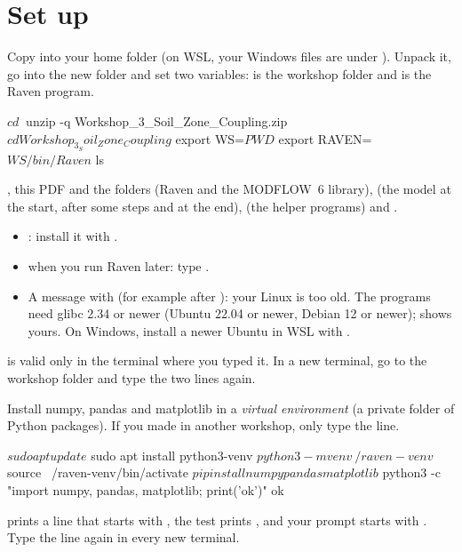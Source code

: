 \section{Set up}

\label{st:unpack}
Copy  into your home folder (on WSL, your Windows files are under
). Unpack it, go into the new folder and set two variables:  is the workshop folder and 
is the Raven program.
\begin{shell}
$ cd ~
$ unzip -q Workshop_3_Soil_Zone_Coupling.zip
$ cd Workshop_3_Soil_Zone_Coupling
$ export WS=$PWD
$ export RAVEN=$WS/bin/Raven
$ ls
\end{shell}
\see {}, this PDF and the folders  (Raven and the MODFLOW~6 library),  (the model at the
start, after some steps and at the end),  (the helper programs) and .
\begin{trouble}
\begin{itemize}
\item {}: install it with .
\item {} when you run Raven later: type .
\item A message with  (for example after ): your Linux is too old. The programs need glibc 2.34 or newer (Ubuntu 22.04 or newer, Debian 12 or newer);  shows yours. On Windows, install a newer Ubuntu in WSL with .
\end{itemize}
\end{trouble}
\begin{note}
 is valid only in the terminal where you typed it. In a new terminal, go to the workshop folder and type the
two  lines again.
\end{note}

\label{st:python}
Install numpy, pandas and matplotlib in a \emph{virtual environment} (a private folder of Python packages). If you made
 in another workshop, only type the  line.
\begin{shell}
$ sudo apt update
$ sudo apt install python3-venv
$ python3 -m venv ~/raven-venv
$ source ~/raven-venv/bin/activate
$ pip install numpy pandas matplotlib
$ python3 -c "import numpy, pandas, matplotlib; print('ok')"
ok
\end{shell}
\see {} prints a line that starts with , the test prints , and your prompt starts
with . Type the  line again in every new terminal.
